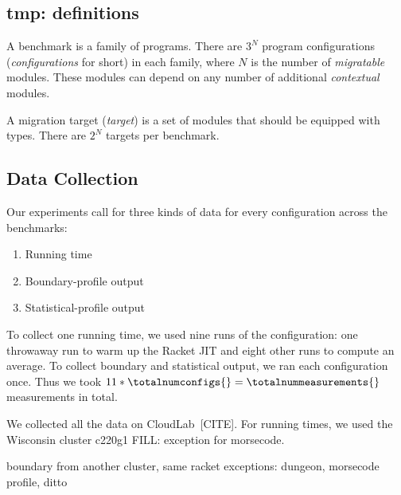 
\subsection{tmp: definitions}

A benchmark is a family of programs.
There are $3^N$ program configurations (\emph{configurations} for short)
in each family, where $N$ is the number of \emph{migratable} modules.
These modules can depend on any number of additional \emph{contextual} modules.

A migration target (\emph{target}) is a set of modules that should be equipped
with types.
There are $2^N$ targets per benchmark.


\subsection{Data Collection}


Our experiments call for three kinds of data for every configuration across the benchmarks:
\begin{enumerate}
  \item Running time
  \item Boundary-profile output
  \item Statistical-profile output
\end{enumerate}

To collect one running time, we used nine runs of the configuration:
one throwaway run to warm up the Racket JIT and eight other runs to compute an average.
To collect boundary and statistical output, we ran each configuration once.
Thus we took $11 * \totalnumconfigs{} = \totalnummeasurements{}$ measurements in total.

We collected all the data on CloudLab~[CITE].
For running times, we used the Wisconsin cluster c220g1 
FILL: exception for morsecode.


boundary from another cluster, same racket
exceptions: dungeon, morsecode
profile, ditto

